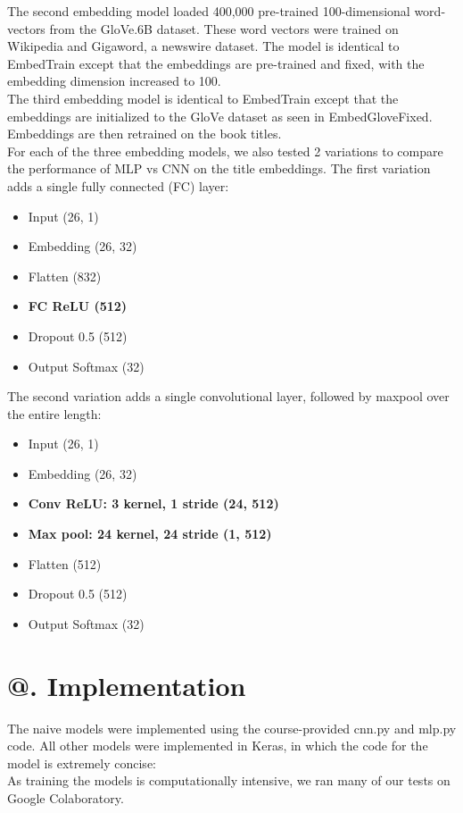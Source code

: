 \documentclass[jou,apacite, 10px]{apa6}
\makeatletter
\newcommand*{\rom}[1]{\expandafter\@slowromancap\romannumeral #1@}
\makeatother
\begin{document}
The second embedding model loaded 400,000 pre-trained 100-dimensional word-vectors from the GloVe.6B dataset. These word vectors were trained on Wikipedia and Gigaword, a newswire dataset. The model is identical to EmbedTrain except that the embeddings are pre-trained and fixed, with the embedding dimension increased to 100.\\
The third embedding model is identical to EmbedTrain except that the embeddings are initialized to the GloVe dataset as seen in EmbedGloveFixed. Embeddings are then retrained on the book titles.\\
For each of the three embedding models, we also tested 2 variations to compare the performance of MLP vs CNN on the title embeddings. The first variation adds a single fully connected (FC) layer:\\
\begin{itemize}
    \item Input (26, 1)
    \item Embedding (26, 32)
    \item Flatten (832)
    \item \textbf{FC ReLU (512)}
    \item Dropout 0.5 (512)
    \item Output Softmax (32)
\end{itemize}\rule{0pt}{4ex}
The second variation adds a single convolutional layer, followed by maxpool over the entire length:

\begin{itemize}
    \item Input (26, 1)
    \item Embedding (26, 32)
    \item \textbf{Conv ReLU: 3 kernel, 1 stride (24, 512)}
    \item \textbf{Max pool: 24 kernel, 24 stride (1, 512)}
    \item Flatten (512)
    \item Dropout 0.5 (512)
    \item Output Softmax (32)
\end{itemize}

\section{\rom{4}. Implementation}

The naive models were implemented using the course-provided cnn.py and mlp.py code. All other models were implemented in Keras, in which the code for the model is extremely concise:\\

As training the models is computationally intensive, we ran many of our tests on Google Colaboratory.\\
\end{document}
